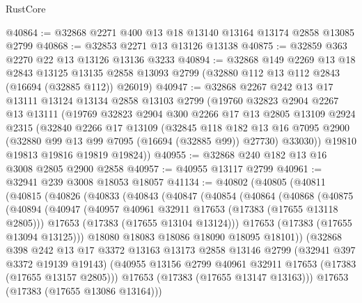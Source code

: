 \begin{lexlean}{RustCore}
\begin{coremodule}
@40864 := @32868 @2271 @400 @13 @18 @13140 @13164 @13174 @2858 @13085 @2799
@40868 := @32853 @2271 @13 @13126 @13138
@40875 := @32859 @363 @2270 @22 @13 @13126 @13136 @3233
@40894 := @32868
    @149
    @2269
    @13
    @18
    @2843
    @13125
    @13135
    @2858
    @13093
    @2799
    (@32880 @112 @13 @112 @2843 (@16694 (@32885 @112)) @26019)
@40947 := @32868
    @2267
    @242
    @13
    @17
    @13111
    @13124
    @13134
    @2858
    @13103
    @2799
    (@19760
      @32823
      @2904
      @2267
      @13
      @13111
      (@19769
        @32823
        @2904
        @300
        @2266
        @17
        @13
        @2805
        @13109
        @2924
        @2315
        (@32840
          @2266
          @17
          @13109
          (@32845
            @118
            @182
            @13
            @16
            @7095
            @2900
            (@32880 @99 @13 @99 @7095 (@16694 (@32885 @99)) @27730)
            @33030))
        @19810
        @19813
        @19816
        @19819
        @19824))
@40955 := @32868 @240 @182 @13 @16 @3008 @2805 @2900 @2858
@40957 := @40955 @13117 @2799
@40961 := @32941 @239 @3008 @18053 @18057
@41134 := @40802
    (@40805
      (@40811
        (@40815
          (@40826
            (@40833
              (@40843
                (@40847
                  (@40854
                    (@40864
                      (@40868
                        (@40875
                          (@40894
                            (@40947
                              (@40957 @40961 @32911 @17653 (@17383 (@17655 @13118 @2805)))
                              @17653
                              (@17383 (@17655 @13104 @13124)))
                            @17653
                            (@17383 (@17655 @13094 @13125)))
                          @18080
                          @18083
                          @18086
                          @18090
                          @18095
                          @18101))
                      (@32868
                        @398
                        @242
                        @13
                        @17
                        @3372
                        @13163
                        @13173
                        @2858
                        @13146
                        @2799
                        (@32941 @397 @3372 @19139 @19143)
                        (@40955 @13156 @2799 @40961 @32911 @17653 (@17383 (@17655 @13157 @2805)))
                        @17653
                        (@17383 (@17655 @13147 @13163)))
                      @17653
                      (@17383 (@17655 @13086 @13164)))

\end{coremodule}
\end{lexlean}
